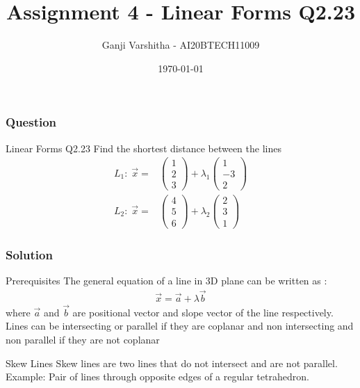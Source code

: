 \documentclass{beamer}
\title{Assignment 4 - Linear Forms Q2.23}
\author{Ganji Varshitha - AI20BTECH11009}
\date{\today }
\newcommand{\myvec}[1]{\ensuremath{\begin{pmatrix}#1\end{pmatrix}}}
\begin{document}
\begin{frame}
\titlepage
\end{frame}

\begin{frame}
\frametitle{Question}
\begin{block}{Linear Forms Q2.23}
Find the shortest distance between the lines
\begin{align}
\label{eq:1}
 L_{1}: \; \Vec{x} ={}& \myvec{1 \\ 2\\ 3 } +\lambda_{1}\myvec{1 \\ -3 \\ 2}\\
 \label{eq:2}
 L_{2}: \; \Vec{x} ={}& \myvec{4 \\ 5\\ 6} + \lambda_{2}\myvec{2 \\ 3 \\ 1} 
\end{align}
\end{block}
\end{frame}

\begin{frame}
\frametitle{Solution}
\begin{block}{Prerequisites}
The general equation of a line in 3D plane can be written as :
\begin{align}
\Vec{x}= \Vec{a}+\lambda\Vec{b} \label{eq:3}  
\end{align}
where $\Vec{a}$ and $\Vec{b}$ are positional vector and slope vector of the line respectively.\\
Lines can be intersecting or parallel if they are coplanar and non intersecting and non parallel if they are not coplanar 
\end{block}
\begin{block}{Skew Lines}
Skew lines are two lines that do not intersect and are not parallel.\\
Example: Pair of lines through opposite edges of a regular tetrahedron.
\end{block}

\end{frame}
\end{document}
